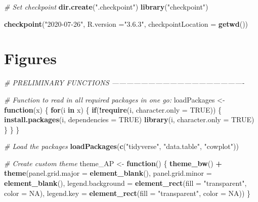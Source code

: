 \documentclass[11pt,]{article}
\newenvironment{Shaded}{\begin{snugshade}}{\end{snugshade}}
\newcommand{\CommentTok}[1]{\textcolor[rgb]{0.56,0.35,0.01}{\textit{#1}}}
\newcommand{\ControlFlowTok}[1]{\textcolor[rgb]{0.13,0.29,0.53}{\textbf{#1}}}
\newcommand{\DataTypeTok}[1]{\textcolor[rgb]{0.13,0.29,0.53}{#1}}
\newcommand{\KeywordTok}[1]{\textcolor[rgb]{0.13,0.29,0.53}{\textbf{#1}}}
\newcommand{\NormalTok}[1]{#1}
\newcommand{\OperatorTok}[1]{\textcolor[rgb]{0.81,0.36,0.00}{\textbf{#1}}}
\newcommand{\OtherTok}[1]{\textcolor[rgb]{0.56,0.35,0.01}{#1}}
\newcommand{\StringTok}[1]{\textcolor[rgb]{0.31,0.60,0.02}{#1}}
\begin{document}
\begin{Shaded}
\begin{Highlighting}[]
\CommentTok{# Set checkpoint}
\KeywordTok{dir.create}\NormalTok{(}\StringTok{".checkpoint"}\NormalTok{)}
\KeywordTok{library}\NormalTok{(}\StringTok{"checkpoint"}\NormalTok{)}

\KeywordTok{checkpoint}\NormalTok{(}\StringTok{"2020-07-26"}\NormalTok{, }
           \DataTypeTok{R.version =}\StringTok{"3.6.3"}\NormalTok{, }
           \DataTypeTok{checkpointLocation =} \KeywordTok{getwd}\NormalTok{())}
\end{Highlighting}
\end{Shaded}

\hypertarget{figures}{%
\section{Figures}\label{figures}}

\newpage

\begin{Shaded}
\begin{Highlighting}[]
\CommentTok{# PRELIMINARY FUNCTIONS -------------------------------------------------------}

\CommentTok{# Function to read in all required packages in one go:}
\NormalTok{loadPackages <-}\StringTok{ }\ControlFlowTok{function}\NormalTok{(x) \{}
  \ControlFlowTok{for}\NormalTok{(i }\ControlFlowTok{in}\NormalTok{ x) \{}
    \ControlFlowTok{if}\NormalTok{(}\OperatorTok{!}\KeywordTok{require}\NormalTok{(i, }\DataTypeTok{character.only =} \OtherTok{TRUE}\NormalTok{)) \{}
      \KeywordTok{install.packages}\NormalTok{(i, }\DataTypeTok{dependencies =} \OtherTok{TRUE}\NormalTok{)}
      \KeywordTok{library}\NormalTok{(i, }\DataTypeTok{character.only =} \OtherTok{TRUE}\NormalTok{)}
\NormalTok{    \}}
\NormalTok{  \}}
\NormalTok{\}}

\CommentTok{# Load the packages}
\KeywordTok{loadPackages}\NormalTok{(}\KeywordTok{c}\NormalTok{(}\StringTok{"tidyverse"}\NormalTok{, }\StringTok{"data.table"}\NormalTok{, }\StringTok{"cowplot"}\NormalTok{))}

\CommentTok{# Create custom theme}
\NormalTok{theme_AP <-}\StringTok{ }\ControlFlowTok{function}\NormalTok{() \{}
  \KeywordTok{theme_bw}\NormalTok{() }\OperatorTok{+}
\StringTok{    }\KeywordTok{theme}\NormalTok{(}\DataTypeTok{panel.grid.major =} \KeywordTok{element_blank}\NormalTok{(),}
          \DataTypeTok{panel.grid.minor =} \KeywordTok{element_blank}\NormalTok{(),}
          \DataTypeTok{legend.background =} \KeywordTok{element_rect}\NormalTok{(}\DataTypeTok{fill =} \StringTok{"transparent"}\NormalTok{,}
                                           \DataTypeTok{color =} \OtherTok{NA}\NormalTok{),}
          \DataTypeTok{legend.key =} \KeywordTok{element_rect}\NormalTok{(}\DataTypeTok{fill =} \StringTok{"transparent"}\NormalTok{,}
                                    \DataTypeTok{color =} \OtherTok{NA}\NormalTok{))}
\NormalTok{\}}
\end{Highlighting}
\end{Shaded}
\end{document}
